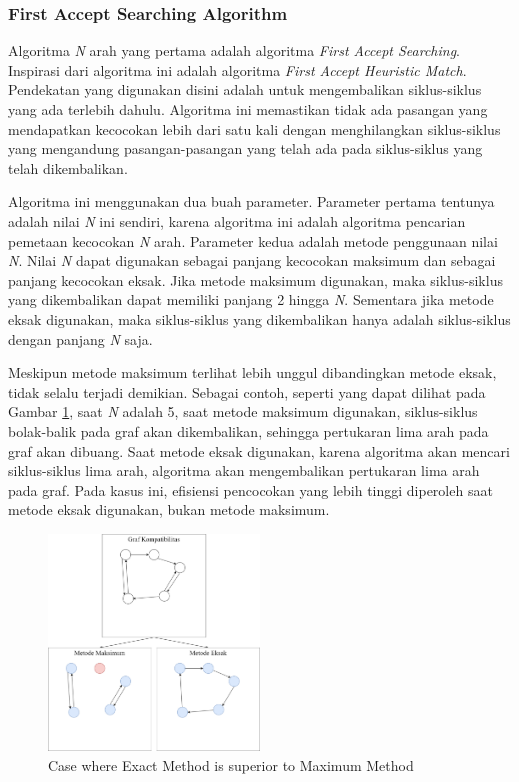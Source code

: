 \documentclass[conference]{IEEEtran}
\begin{document}
\subsubsection{First Accept Searching Algorithm}
Algoritma \textit{N} arah yang pertama adalah algoritma \textit{First Accept Searching}. Inspirasi dari algoritma ini adalah
algoritma \textit{First Accept Heuristic Match}. Pendekatan yang digunakan disini adalah untuk mengembalikan siklus-siklus
yang ada terlebih dahulu. Algoritma ini memastikan tidak ada pasangan yang mendapatkan kecocokan lebih dari satu kali dengan
menghilangkan siklus-siklus yang mengandung pasangan-pasangan yang telah ada pada siklus-siklus yang telah dikembalikan.

Algoritma ini menggunakan dua buah parameter. Parameter pertama tentunya adalah nilai \textit{N} ini sendiri, karena
algoritma ini adalah algoritma pencarian pemetaan kecocokan \textit{N} arah. Parameter kedua adalah metode penggunaan
nilai \textit{N}. Nilai \textit{N} dapat digunakan sebagai panjang kecocokan maksimum dan sebagai panjang kecocokan eksak.
Jika metode maksimum digunakan, maka siklus-siklus yang dikembalikan dapat memiliki panjang 2 hingga \textit{N}. Sementara
jika metode eksak digunakan, maka siklus-siklus yang dikembalikan hanya adalah siklus-siklus dengan panjang \textit{N} saja.

Meskipun metode maksimum terlihat lebih unggul dibandingkan metode eksak, tidak selalu terjadi demikian. Sebagai contoh, seperti
yang dapat dilihat pada Gambar \ref{maxvsexact}, saat \textit{N} adalah 5, saat metode maksimum digunakan, siklus-siklus bolak-balik
pada graf akan dikembalikan, sehingga pertukaran lima arah pada graf akan dibuang. Saat metode eksak digunakan, karena algoritma
akan mencari siklus-siklus lima arah, algoritma akan mengembalikan pertukaran lima arah pada graf. Pada kasus ini, efisiensi pencocokan
yang lebih tinggi diperoleh saat metode eksak digunakan, bukan metode maksimum.

\begin{figure}[h]
    \includegraphics[width=0.5\textwidth]{images/maksimum-vs-eksak.png}
    \caption{Case where Exact Method is superior to Maximum Method}
    \label{maxvsexact}
\end{figure}
\end{document}
